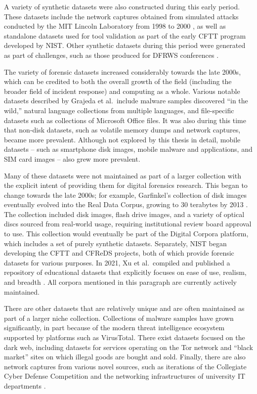 \documentclass[letterpaper,12pt]{report}
\begin{document}
A variety of synthetic datasets were also constructed during this early
period. These datasets include the network captures obtained from
simulated attacks conducted by the MIT Lincoln Laboratory from 1998 to
2000 \cite{garfinkelForensicCorporaChallenge2007}, as well as
standalone datasets used for tool validation as part of the early CFTT
program developed by NIST. Other synthetic datasets during this period
were generated as part of challenges, such as those produced for DFRWS
conferences \cite{woodsCreatingRealisticCorpora2011}.

The variety of forensic datasets increased considerably towards the late
2000s, which can be credited to both the overall growth of the field
(including the broader field of incident response) and computing as a
whole. Various notable datasets described by Grajeda et al.~include
malware samples discovered ``in the wild,'' natural language collections
from multiple languages, and file-specific datasets such as collections
of Microsoft Office files. It was also during this time that non-disk
datasets, such as volatile memory dumps and network captures, became
more prevalent. Although not explored by this thesis in detail, mobile
datasets -- such as smartphone disk images, mobile malware and
applications, and SIM card images -- also grew more prevalent.

Many of these datasets were not maintained as part of a larger
collection with the explicit intent of providing them for digital
forensics research. This began to change towards the late 2000s; for
example, Garfinkel's collection of disk images eventually evolved into
the Real Data Corpus, growing to 30 terabytes by 2013
\cite{garfinkelBringingScienceDigital2009,yannikosDataCorporaDigital2014}.
The collection included disk images, flash drive images, and a variety
of optical discs sourced from real-world usage, requiring institutional
review board approval to use. This collection would eventually be part
of the Digital Corpora platform, which includes a set of purely
synthetic datasets. Separately, NIST began developing the CFTT and
CFReDS projects, both of which provide forensic datasets for various
purposes. In 2021, Xu et al.~compiled and published a repository of
educational datasets that explicitly focuses on ease of use, realism,
and breadth \cite{xuDesigningSharedDigital2022}. All corpora
mentioned in this paragraph are currently actively maintained.

There are other datasets that are relatively unique and are often
maintained as part of a larger niche collection. Collections of malware
samples have grown significantly, in part because of the modern threat
intelligence ecosystem supported by platforms such as VirusTotal. There
exist datasets focused on the dark web, including datasets for services
operating on the Tor network and ``black market'' sites on which illegal
goods are bought and sold. Finally, there are also network captures from
various novel sources, such as iterations of the Collegiate Cyber
Defense Competition and the networking infrastructures of university IT
departments \cite{grajedaAvailabilityDatasetsDigital2017}.
\end{document}
